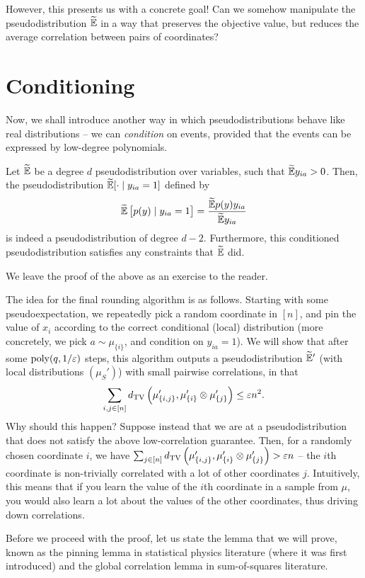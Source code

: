 \documentclass{article}
\begin{document}
However, this presents us with a concrete goal! Can we somehow manipulate the pseudodistribution $\widetilde{\mathbb{E}}$ in a way that preserves the objective value, but reduces the average correlation between pairs of coordinates?

\section{Conditioning}

Now, we shall introduce another way in which pseudodistributions behave like real distributions -- we can \emph{condition} on events, provided that the events can be expressed by low-degree polynomials.

\begin{lemma}
	Let $\widetilde{\mathbb{E}}$ be a degree $d$ pseudodistribution over variables, such that $\widetilde{\mathbb{E}} y_{ia} > 0$. Then, the pseudodistribution $\widetilde{\mathbb{E}}[ \cdot \mid y_{ia} = 1 ]$ defined by
	\[ \widetilde{\mathbb{E}} \left[ p(y) \mid y_{ia} = 1 \right] = \frac{\widetilde{\mathbb{E}} p(y) y_{ia}}{\widetilde{\mathbb{E}} y_{ia}} \]
	is indeed a pseudodistribution of degree $d-2$. Furthermore, this conditioned pseudodistribution satisfies any constraints that $\widetilde{\mathbb{E}}$ did.
\end{lemma}

We leave the proof of the above as an exercise to the reader.

The idea for the final rounding algorithm is as follows. Starting with some pseudoexpectation, we repeatedly pick a random coordinate in $[n]$, and pin the value of $x_i$ according to the correct conditional (local) distribution (more concretely, we pick $a \sim \mu_{\{i\}}$, and condition on $y_{ia} = 1$). We will show that after some $\operatorname{poly}(q,1/\varepsilon)$ steps, this algorithm outputs a pseudodistribution $\widetilde{\mathbb{E}}'$ (with local distributions $(\mu_S')$) with small pairwise correlations, in that
\[ \sum_{i,j \in [n]} d_{\mathrm{TV}}\left( \mu'_{\{i,j\}} , \mu'_{\{i\}} \otimes \mu'_{\{j\}} \right) \le \varepsilon n^2. \]
Why should this happen? Suppose instead that we are at a pseudodistribution that does not satisfy the above low-correlation guarantee. Then, for a randomly chosen coordinate $i$, we have $ \sum_{j \in [n]} d_{\mathrm{TV}}\left( \mu'_{\{i,j\}} , \mu'_{\{i\}} \otimes \mu'_{\{j\}} \right) > \varepsilon n$ -- the $i$th coordinate is non-trivially correlated with a lot of other coordinates $j$. Intuitively, this means that if you learn the value of the $i$th coordinate in a sample from $\mu$, you would also learn a lot about the values of the other coordinates, thus driving down correlations.

Before we proceed with the proof, let us state the lemma that we will prove, known as the pinning lemma in statistical physics literature (where it was first introduced) and the global correlation lemma in sum-of-squares literature.
\end{document}
